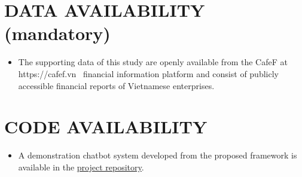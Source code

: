 \section*{DATA AVAILABILITY (mandatory)}
\begin{itemize}[topsep=0.3ex, itemsep=0.3ex, parsep=0.2ex]
    \item[-]The supporting data of this study are openly available from the CafeF at https://cafef.vn~ financial information platform and consist of publicly accessible financial reports of Vietnamese enterprises.

\end{itemize}
\section*{CODE AVAILABILITY}
\begin{itemize}[topsep=0.3ex, itemsep=0.3ex, parsep=0.2ex]
    \item[-]A demonstration chatbot system developed from the proposed framework is available in the \href{https://github.com/DungPhanHoangg05/A-Multi-Agent-Large-Language-Model-Approach-to-Price-Driven-Stock-Trading-in-the-Vietnamese-Stock-Ma.git}{project repository}.

\end{itemize}









\clearpage


